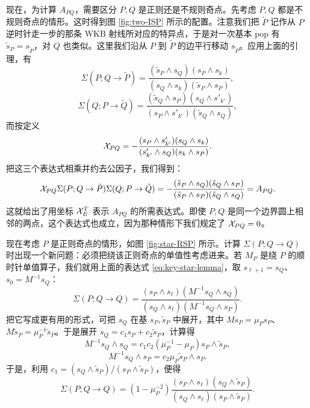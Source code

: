 现在，为计算 $A_{PQ}$，需要区分 $P,Q$ 是正则还是不规则奇点。先考虑 $P,Q$ 都是不规则奇点的情形。这时得到图 \ref{fig:two-ISP} 所示的配置。注意我们把 $\tilde P$ 记作从 $P$ 逆时针走一步的那条 WKB 射线所对应的特异点，于是对一次基本 pop 有 $\tilde s_P=s_{\tilde P}$，对 $Q$ 也类似。这里我们沿从 $P$ 到 $\tilde P$ 的边平行移动 $s_{\tilde P}$。应用上面的引理，有
\begin{equation}
\Sigma(P;Q\to\tilde P)=\frac{(\tilde s_P\wedge s_Q)(s_P\wedge s_k)}{(s_Q\wedge s_k)(\tilde s_P\wedge s_P)},
\end{equation}
\begin{equation}
\Sigma(Q;P\to\tilde Q)=\frac{(\tilde s_Q\wedge s_P)(s_Q\wedge s'_{k'})}{(s_P\wedge s'_{k'})(\tilde s_Q\wedge s_Q)},
\end{equation}
而按定义
\begin{equation}
\mathcal{X}_{PQ}=-\frac{(s_P\wedge s'_{k'})(s_Q\wedge s_k)}{(s'_{k'}\wedge s_Q)(s_k\wedge s_P)}.
\end{equation}
把这三个表达式相乘并约去公因子，我们得到：
\begin{equation}\label{eq:two-ISP}
\mathcal{X}_{PQ}\Sigma(P;Q\to\tilde P)\Sigma(Q;P\to\tilde Q)=-\frac{(\tilde s_P\wedge s_Q)(\tilde s_Q\wedge s_P)}{(\tilde s_P\wedge s_P)(\tilde s_Q\wedge s_Q)}=A_{PQ}.
\end{equation}
这就给出了用坐标 $\mathcal{X}_E^T$ 表示 $A_{PQ}$ 的所需表达式。即使 $P,Q$ 是同一个边界圆上相邻的两点，这个表达式也成立，因为那种情形下我们规定了 $\mathcal{X}_{PQ}=0$。


现在考虑 $P$ 是正则奇点的情形，如图 \ref{fig:star-RSP} 所示。计算 $\Sigma(P;Q\to Q)$ 时出现一个新问题：必须把绕该正则奇点的单值性考虑进来。若 $M_P$ 是绕 $P$ 的顺时针单值算子，我们就用上面的表达式 \eqref{eq:key-star-lemma}，取 $s_{\ell+1}=s_Q$、$s_0=M^{-1}s_Q$：
\begin{equation}
\Sigma(P;Q\to Q)=\frac{(s_P\wedge s_\ell)(M^{-1}s_Q\wedge s_Q)}{(s_Q\wedge s_\ell)(M^{-1}s_Q\wedge s_P)}.
\end{equation}
把它写成更有用的形式，可把 $s_Q$ 在基 $s_P,\tilde s_P$ 中展开，其中 $Ms_P=\mu_P s_P$、$M\tilde s_P=\mu_P^{-1}\tilde s_P$。于是展开 $s_Q=c_1s_P+c_2\tilde s_P$，计算得
\begin{equation}
M^{-1}s_Q\wedge s_Q=c_1c_2(\mu_P^{-1}-\mu_P)s_P\wedge\tilde s_P,
\end{equation}
\begin{equation}
M^{-1}s_Q\wedge s_P=c_2\mu_P\tilde s_P\wedge s_P.
\end{equation}
于是，利用 $c_1=(s_Q\wedge\tilde s_P)/(s_P\wedge\tilde s_P)$，便得
\begin{equation}\label{eq:SimpleRSP}
\Sigma(P;Q\to Q)=(1-\mu_P^{-2})\frac{(s_P\wedge s_\ell)(s_Q\wedge\tilde s_P)}{(s_Q\wedge s_\ell)(s_P\wedge\tilde s_P)}.
\end{equation}

